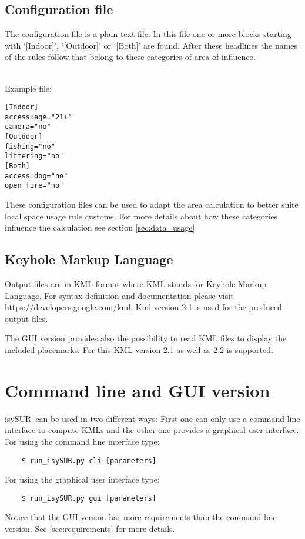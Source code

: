 \documentclass[11pt,fleqn]{book} %
\newcommand{\ProjectTitle}{isySUR}
\newcommand{\pt}{\ProjectTitle}
\begin{document}
\subsection{Configuration file}\label{sec:confinput}
The configuration file is a plain text file. In this file one or more blocks starting with `[Indoor]', `[Outdoor]' or `[Both]' are found. After these headlines the names of the rules follow that belong to these categories of area of influence.
\\~

Example file:
\begin{verbatim}
[Indoor]
access:age="21+"
camera="no"
[Outdoor]
fishing="no"
littering="no"
[Both]
access:dog="no"
open_fire="no"
\end{verbatim}

These configuration files can be used to adapt the area calculation to better suite local space usage rule customs. For more details about how these categories influence the calculation see section \ref{sec:data_usage}.

\subsection{Keyhole Markup Language}
Output files are in KML format where KML stands for Keyhole Markup Language. For syntax definition and documentation please visit \url{https://developers.google.com/kml}. Kml version 2.1 is used for the produced output files.

The GUI version provides also the possibility to read KML files to display the included placemarks. For this KML version 2.1 as well as 2.2 is supported.

\section{Command line and GUI version}\label{sec:usage}
\pt\ can be used in two different ways: First one can only use a command line interface to compute KMLs and the other one provides a graphical user interface.
For using the command line interface type:
\begin{verbatim}
	$ run_isySUR.py cli [parameters]
\end{verbatim}
For using the graphical user interface type:
\begin{verbatim}
	$ run_isySUR.py gui [parameters]
\end{verbatim}

Notice that the GUI version has more requirements than the command line version. See \ref{sec:requirements} for more details.
\end{document}
